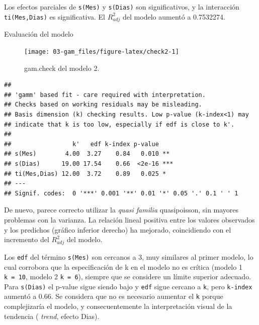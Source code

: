 \documentclass[
]{book}
\newenvironment{Shaded}{\begin{snugshade}}{\end{snugshade}}
\newcommand{\AttributeTok}[1]{\textcolor[rgb]{0.77,0.63,0.00}{#1}}
\newcommand{\DecValTok}[1]{\textcolor[rgb]{0.00,0.00,0.81}{#1}}
\newcommand{\FunctionTok}[1]{\textcolor[rgb]{0.00,0.00,0.00}{#1}}
\newcommand{\NormalTok}[1]{#1}
\newcommand{\SpecialCharTok}[1]{\textcolor[rgb]{0.00,0.00,0.00}{#1}}
\newcommand{\StringTok}[1]{\textcolor[rgb]{0.31,0.60,0.02}{#1}}
\begin{document}
Los efectos parciales de \texttt{s(Mes)} y \texttt{s(Dias)} son significativos, y la interacción \texttt{ti(Mes,Dias)} es significativa. El \(R_{adj}^{2}\) del modelo aumentó a 0.7532274.

Evaluación del modelo

\begin{Shaded}
\end{Shaded}

\begin{figure}

{\centering \texttt{[image: 03-gam\_files/figure-latex/check2-1]} 

}

\caption{gam.check del modelo 2.}\label{fig:check2}
\end{figure}

\begin{verbatim}
## 
## 'gamm' based fit - care required with interpretation.
## Checks based on working residuals may be misleading.
## Basis dimension (k) checking results. Low p-value (k-index<1) may
## indicate that k is too low, especially if edf is close to k'.
## 
##                 k'   edf k-index p-value    
## s(Mes)        4.00  3.27    0.84   0.010 ** 
## s(Dias)      19.00 17.54    0.66  <2e-16 ***
## ti(Mes,Dias) 12.00  3.72    0.89   0.025 *  
## ---
## Signif. codes:  0 '***' 0.001 '**' 0.01 '*' 0.05 '.' 0.1 ' ' 1
\end{verbatim}

De nuevo, parece correcto utilizar la \emph{quasi familia} quasipoisson, sin mayores problemas con la varianza. La relación lineal positiva entre los valores observados y los predichos (gráfico inferior derecho) ha mejorado, coincidiendo con el incremento del \(R_{adj}^{2}\) del modelo.

Los \texttt{edf} del término \texttt{s(Mes)} son cercanos a 3, muy similares al primer modelo, lo cual corrobora que la especificación de k en el modelo no es crítica (modelo 1 \texttt{k\ =\ 10}, modelo 2 \texttt{k\ =\ 6}), siempre que se considere un límite superior adecuado. Para \texttt{s(Dias)} el p-value sigue siendo bajo y \texttt{edf} sigue cercano a \texttt{k\textquotesingle{}}, pero \texttt{k-index} aumentó a 0.66. Se considera que no es necesario aumentar el \texttt{k} porque complejizaría el modelo, y consecuentemente la interpretación visual de la tendencia ( \emph{trend}, efecto Dias).
\end{document}
